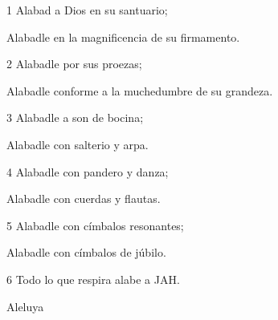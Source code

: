 \par 1 Alabad a Dios en su santuario;
\par Alabadle en la magnificencia de su firmamento.
\par 2 Alabadle por sus proezas;
\par Alabadle conforme a la muchedumbre de su grandeza.
\par 3 Alabadle a son de bocina;
\par Alabadle con salterio y arpa.
\par 4 Alabadle con pandero y danza;
\par Alabadle con cuerdas y flautas.
\par 5 Alabadle con címbalos resonantes;
\par Alabadle con címbalos de júbilo.
\par 6 Todo lo que respira alabe a JAH.
\par Aleluya



